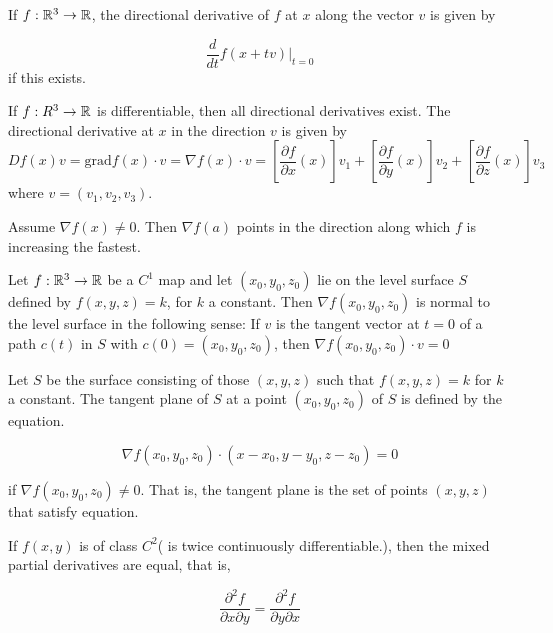 \begin{defn}
	If $f: \mathbb{R}^3 \rightarrow \mathbb{R}$, the directional derivative of $f$ at $x$ along the vector $v$ is given by
	
	$$\dfrac{d}{dt}f(x+tv)|_{t = 0}$$
	if this exists.	
\end{defn}

\begin{thm*}
	If $f:R^3 \rightarrow \mathbb{R}$ is differentiable, then all directional derivatives exist. The directional derivative at $x$ in the direction $v$ is given by 
	$$Df(x)v = \text{grad}f(x)\cdot v = \nabla f(x) \cdot v = [\dfrac{\partial f}{\partial x}(x)]v_1 + [\dfrac{\partial f}{\partial y}(x)]v_2 + [\dfrac{\partial f}{\partial z}(x)]v_3$$
	where $v = (v_1,v_2,v_3)$.
\end{thm*}

\begin{thm*}
	Assume $\nabla f(x) \neq 0$. Then $\nabla f(a)$ points in the direction along which $f$ is increasing the fastest.	
\end{thm*}

\begin{thm*}
	Let $f:\mathbb{R}^3 \rightarrow \mathbb{R}$ be a $C^1$ map and let $(x_0,y_0,z_0)$ lie on the level surface $S$ defined by $f(x,y,z) = k$, for $k$ a constant. Then $\nabla f(x_0,y_0,z_0)$ is normal to the level surface in the following sense: If $v$ is the tangent vector at $t=0$ of a path $c(t)$ in $S$ with $c(0) = (x_0,y_0,z_0)$, then $\nabla f(x_0,y_0,z_0)\cdot v = 0$	
\end{thm*}

\begin{defn}
	Let $S$ be the surface consisting of those $(x,y,z)$ such that $f(x,y,z) = k$ for $k$ a constant. The tangent plane of $S$ at a point $(x_0,y_0,z_0)$ of $S$ is defined by the equation.
	
	$$\nabla f(x_0,y_0,z_0)\cdot (x - x_0,y-y_0,z-z_0) = 0$$
	
	if $\nabla f(x_0,y_0,z_0) \neq 0$. That is, the tangent plane is the set of points $(x,y,z)$ that satisfy equation.	
\end{defn}


\begin{thm*}
	If $f(x,y)$ is of class $C^2$( is twice continuously differentiable.), then the mixed partial derivatives are equal, that is,
	
	$$\dfrac{\partial^2 f}{\partial x \partial y} = \dfrac{\partial^2 f}{\partial y \partial x}$$	
\end{thm*}

